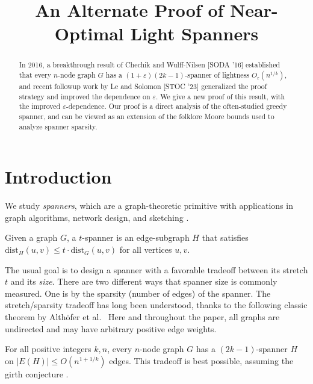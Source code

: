 \documentclass{theoretics}
\title{An Alternate Proof of Near-Optimal Light Spanners}
\newcommand{\eps}{\varepsilon}
\newcommand{\dist}{\text{dist}}
\newcommand{\Althofer}{Alth\"{o}fer}
\begin{document}
\maketitle

\begin{abstract}
In 2016, a breakthrough result of Chechik and Wulff-Nilsen [SODA '16] established that every $n$-node graph $G$ has a $(1+\eps)(2k-1)$-spanner of lightness $O_{\eps}(n^{1/k})$, and recent followup work by Le and Solomon [STOC '23] generalized the proof strategy and improved the dependence on $\eps$.
We give a new proof of this result, with the improved $\eps$-dependence.
Our proof is a direct analysis of the often-studied greedy spanner, and can be viewed as an extension of the folklore Moore bounds used to analyze spanner sparsity.
\end{abstract}

\section{Introduction}

We study \emph{spanners}, which are a graph-theoretic primitive with applications in graph algorithms, network design, and sketching \cite{ABSHJKS20}.
\begin{definition}
Given a graph $G$, a $t$-spanner is an edge-subgraph $H$ that satisfies
$\dist_H(u, v) \le t \cdot \dist_G(u, v)$ for all vertices $u, v$.
\end{definition}

The usual goal is to design a spanner with a favorable tradeoff between its stretch $t$ and its \emph{size}.
There are two different ways that spanner size is commonly measured.
One is by the sparsity (number of edges) of the spanner.
The stretch/sparsity tradeoff has long been understood, thanks to the following classic theorem by \Althofer{} et al.~\cite{ADDJS93}
Here and throughout the paper, all graphs are undirected and may have arbitrary positive edge weights.
\begin{theorem}  \label{thm:sotasparse}
For all positive integers $k, n$, every $n$-node graph $G$ has a $(2k-1)$-spanner $H$ on $|E(H)| \le O(n^{1+1/k})$ edges.
This tradeoff is best possible, assuming the girth conjecture \cite{girth}.
\end{theorem}
\end{document}
